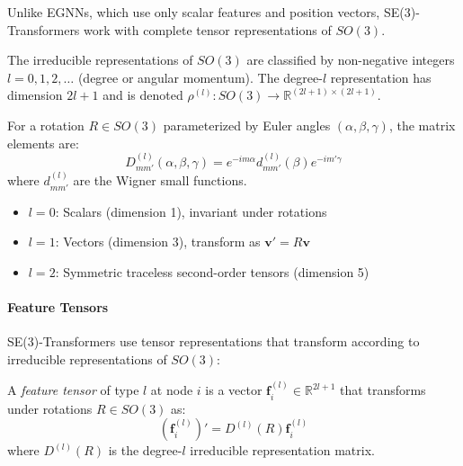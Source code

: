 Unlike EGNNs, which use only scalar features and position vectors, SE(3)-Transformers work with complete tensor representations of $SO(3)$.

\begin{definition}\label{def:irreps_so3}
The irreducible representations of $SO(3)$ are classified by non-negative integers $l = 0, 1, 2, \ldots$ (degree or angular momentum). The degree-$l$ representation has dimension $2l + 1$ and is denoted $\rho^{(l)}: SO(3) \to \mathbb{R}^{(2l+1) \times (2l+1)}$.

For a rotation $R \in SO(3)$ parameterized by Euler angles $(\alpha, \beta, \gamma)$, the matrix elements are:
\begin{equation}
D_{mm'}^{(l)}(\alpha, \beta, \gamma) = e^{-im\alpha} d_{mm'}^{(l)}(\beta) e^{-im'\gamma}
\end{equation}
where $d_{mm'}^{(l)}$ are the Wigner small functions.
\end{definition}

\begin{example}
\leavevmode
\begin{itemize}
    \item $l = 0$: Scalars (dimension 1), invariant under rotations
    \item $l = 1$: Vectors (dimension 3), transform as $\mathbf{v}' = R\mathbf{v}$
    \item $l = 2$: Symmetric traceless second-order tensors (dimension 5)
\end{itemize}
\end{example}

\paragraph{Feature Tensors}

SE(3)-Transformers use tensor representations that transform according to irreducible representations of $SO(3)$:

\begin{definition}\label{def:feature_tensor_se3}
A \textit{feature tensor} of type $l$ at node $i$ is a vector $\mathbf{f}_i^{(l)} \in \mathbb{R}^{2l+1}$ that transforms under rotations $R \in SO(3)$ as:
\begin{equation}
(\mathbf{f}_i^{(l)})' = D^{(l)}(R) \mathbf{f}_i^{(l)}
\end{equation}
where $D^{(l)}(R)$ is the degree-$l$ irreducible representation matrix.
\end{definition}

